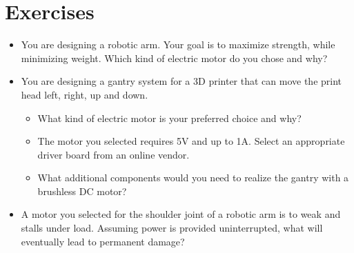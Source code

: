 \section{Exercises}
\begin{itemize}
\item You are designing a robotic arm. Your goal is to maximize strength, while minimizing weight. Which kind of electric motor do you chose and why?
\item You are designing a gantry system for a 3D printer that can move the print head left, right, up and down.
\begin{itemize}
\item What kind of electric motor is your preferred choice and why? 
\item The motor you selected requires 5V and up to 1A. Select an appropriate driver board from an online vendor.
\item What additional components would you need to realize the gantry with a brushless DC motor? 
\end{itemize}
\item A motor you selected for the shoulder joint of a robotic arm is to weak and stalls under load. Assuming power is provided uninterrupted, what will eventually lead to permanent damage? 
\end{itemize}